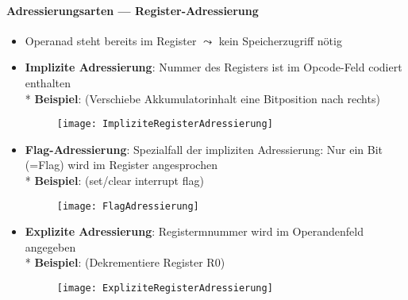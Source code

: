 \paragraph{Adressierungsarten --- Register-Adressierung}
\begin{itemize}
	\item Operanad steht bereits im Register $\leadsto$ kein Speicherzugriff nötig
	\item \textbf{Implizite Adressierung}: Nummer des Registers ist im Opcode-Feld codiert enthalten \\* \textbf{Beispiel}:  (Verschiebe Akkumulatorinhalt eine Bitposition nach rechts)
		\begin{figure}[ht]
		  \centering
		  \texttt{[image: ImpliziteRegisterAdressierung]}
		  \label{ImpliziteRegisterAdressierung}
		\end{figure}
	\item \textbf{Flag-Adressierung}: Spezialfall der impliziten Adressierung: Nur ein Bit (=Flag) wird im Register angesprochen \\* \textbf{Beispiel}:  (set/clear interrupt flag)
		\begin{figure}[ht]
		  \centering
		  \texttt{[image: FlagAdressierung]}
		  \label{FlagAdressierung}
		\end{figure}
	\item \textbf{Explizite Adressierung}: Registermnummer wird im Operandenfeld angegeben \\* \textbf{Beispiel}:  (Dekrementiere Register R0)
		\begin{figure}[ht]
		  \centering
		  \texttt{[image: ExpliziteRegisterAdressierung]}
		  \label{ExpliziteRegisterAdressierung}
		\end{figure}
\end{itemize}

